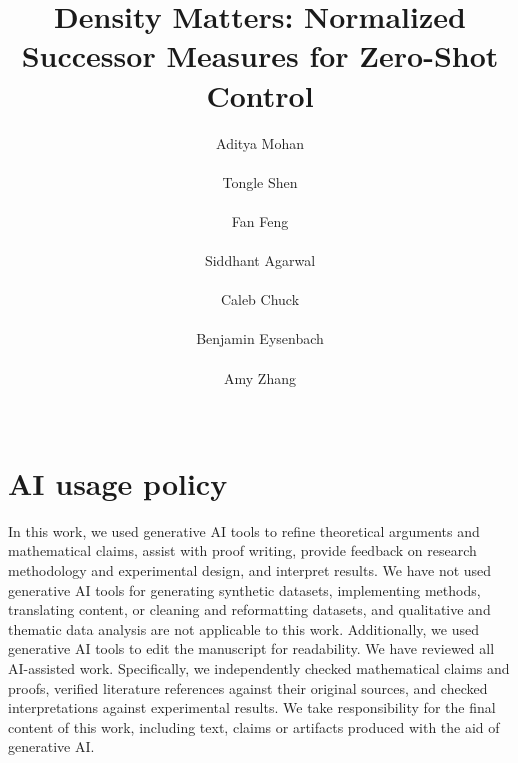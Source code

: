\documentclass{article}
\title{Density Matters: Normalized Successor Measures for Zero-Shot Control}
\author{%
Aditya Mohan\\
\UniHannover\\
\And
Tongle Shen\\
\UCSD\\
\AND
Fan Feng\\
\UCSD\\
\And
Siddhant Agarwal\\
\UTAustin\\
\AND
Caleb Chuck\\
\Princeton\\
\And
Benjamin Eysenbach\\
\Princeton\\
\AND
Amy Zhang\\
\UTAustin\\
}
\theoremstyle{plain}
\theoremstyle{definition}
\theoremstyle{remark}
\newif\ifcomments
\newcommand{\tongle}[1]{%
  \ifcomments
    \textcolor{red}{[\textbf{Tongle}: #1]}%
  \fi
}
\begin{document}
\maketitle




        

         



\clearpage
\section*{AI usage policy}
In this work, we used generative AI tools to refine theoretical arguments and mathematical claims, assist with proof writing, provide feedback on research methodology and experimental design, and interpret results. 
We have not used generative AI tools for generating synthetic datasets, implementing methods, translating content, or cleaning and reformatting datasets, and qualitative and thematic data analysis are not applicable to this work. 
Additionally, we used generative AI tools to edit the manuscript for readability. 
We have reviewed all AI-assisted work. 
Specifically, we independently checked mathematical claims and proofs, verified literature references against their original sources, and checked interpretations against experimental results. We take responsibility for the final content of this work, including text, claims or artifacts produced with the aid of generative AI.








\newpage

\appendix

 



\end{document}
